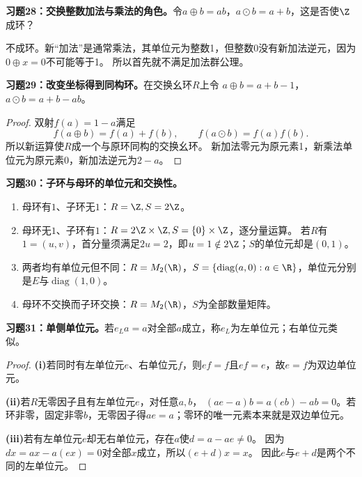 \begin{problem}
\textbf{习题28：交换整数加法与乘法的角色。}令$a\oplus b=ab$，$a\odot b=a+b$，这是否使$\Z$成环？
\end{problem}
\begin{solution}
不成环。新“加法”是通常乘法，其单位元为整数1，但整数0没有新加法逆元，因为$0\oplus x=0$不可能等于1。
所以首先就不满足加法群公理。
\end{solution}

\begin{problem}
\textbf{习题29：改变坐标得到同构环。}在交换幺环$R$上令
$a\oplus b=a+b-1$，$a\odot b=a+b-ab$。
\end{problem}
\begin{proof}
双射$f(a)=1-a$满足
\[
f(a\oplus b)=f(a)+f(b),\qquad f(a\odot b)=f(a)f(b).
\]
所以新运算使$R$成一个与原环同构的交换幺环。
新加法零元为原元素1，新乘法单位元为原元素0，新加法逆元为$2-a$。
\end{proof}

\begin{problem}
\textbf{习题30：子环与母环的单位元和交换性。}
\end{problem}
\begin{solution}
\begin{enumerate}
\item 母环有$1$、子环无$1$：$R=\Z,S=2\Z$。
\item 母环无$1$、子环有$1$：$R=2\Z\times\Z,S=\{0\}\times\Z$，逐分量运算。
若$R$有$1=(u,v)$，首分量须满足$2u=2$，即$u=1\notin2\Z$；$S$的单位元却是$(0,1)$。
\item 两者均有单位元但不同：$R=M_2(\R)$，$S=\{\operatorname{diag}(a,0):a\in\R\}$，单位元分别是$E$与$\operatorname{diag}(1,0)$。
\item 母环不交换而子环交换：$R=M_2(\R)$，$S$为全部数量矩阵。
\end{enumerate}
\end{solution}

\begin{problem}
\textbf{习题31：单侧单位元。}若$e_La=a$对全部$a$成立，称$e_L$为左单位元；右单位元类似。
\end{problem}
\begin{proof}
\textbf{(i)}若同时有左单位元$e$、右单位元$f$，则$ef=f$且$ef=e$，故$e=f$为双边单位元。

\textbf{(ii)}若$R$无零因子且有左单位元$e$，对任意$a,b$，
$(ae-a)b=a(eb)-ab=0$。若环非零，固定非零$b$，无零因子得$ae=a$；零环的唯一元素本来就是双边单位元。

\textbf{(iii)}若有左单位元$e$却无右单位元，存在$a$使$d=a-ae\neq0$。
因为$d x=ax-a(ex)=0$对全部$x$成立，所以$(e+d)x=x$。
因此$e$与$e+d$是两个不同的左单位元。
\end{proof}

